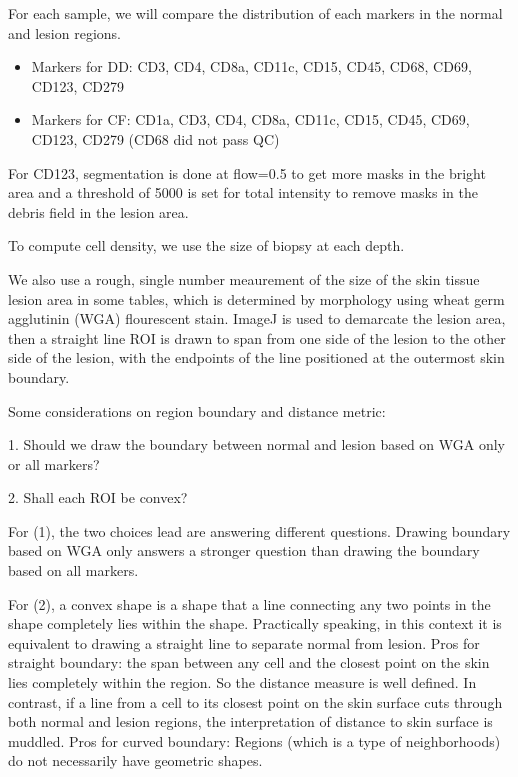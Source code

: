 \documentclass{article}
\begin{document}
\bigskip

For each sample, we will compare the distribution of each markers in the
normal and lesion regions.

\begin{itemize}
\item Markers for DD: CD3, CD4, CD8a, CD11c, CD15, CD45, CD68, CD69, CD123,
CD279

\item Markers for CF: CD1a, CD3, CD4, CD8a, CD11c, CD15, CD45, CD69, CD123,
CD279 (CD68 did not pass QC)
\end{itemize}

For CD123, segmentation is done at flow=0.5 to get more masks in the bright
area and a threshold of 5000 is set for total intensity to remove masks in
the debris field in the lesion area.

\bigskip

To compute cell density, we use the size of biopsy at each depth.

We also use a rough, single number meaurement of the size of the skin tissue lesion area in some tables, which is determined by morphology using
wheat germ agglutinin (WGA) flourescent stain. ImageJ is used to demarcate
the lesion area, then a straight line ROI is drawn to span from one side of
the lesion to the other side of the lesion, with the endpoints of the line
positioned at the outermost skin boundary. \ \ \ \ 

\bigskip

Some considerations on region boundary and distance metric: \ 

1. Should we draw the boundary between normal and lesion based on WGA only
or all markers?

2. Shall each ROI be convex?

For (1), the two choices lead are answering different questions. Drawing
boundary based on WGA only answers a stronger question than drawing the
boundary based on all markers.

For (2), a convex shape is a shape that a line connecting any two points in
the shape completely lies within the shape. Practically speaking, in this
context it is equivalent to drawing a straight line to separate normal from
lesion. Pros for straight boundary: the span between any cell and the
closest point on the skin lies completely within the region. So the distance
measure is well defined. In contrast, if a line from a cell to its closest
point on the skin surface cuts through both normal and lesion regions, the
interpretation of distance to skin surface is muddled. Pros for curved
boundary: Regions (which is a type of neighborhoods) do not necessarily have
geometric shapes.
\end{document}
